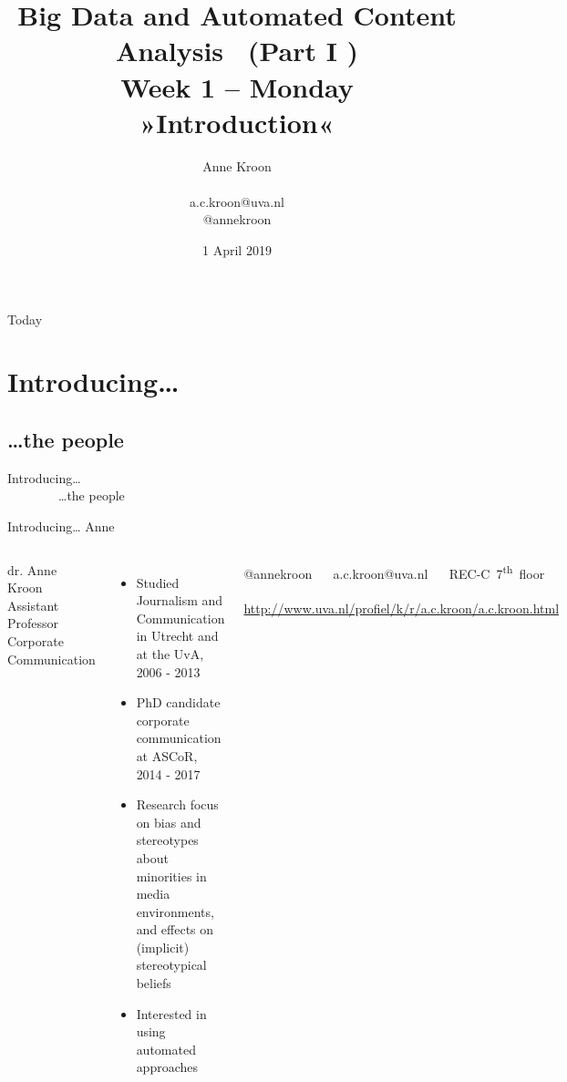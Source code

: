 \documentclass{beamer}
\begin{document}
\title[Big Data and Automated Content Analysis]{\textbf{Big Data and Automated Content Analysis  \ (Part I )} \\ Week 1 -- Monday  \\ »Introduction«}
\author[Anne Kroon]{Anne Kroon \\ ~ \\ \footnotesize{a.c.kroon@uva.nl \\@annekroon} \\}
\date{1 April 2019}


\begin{frame}{}
\titlepage
\end{frame}

\begin{frame}{Today}
\tableofcontents
\end{frame}

\section{Introducing\ldots}
\subsection{\ldots the people}

\begin{frame} 
	Introducing\ldots \\
	~~~~~~~~\ldots the people
\end{frame}


\begin{frame}{Introducing\ldots} {\huge{Anne}} \small{} 
	\begin{columns}[]    dr. Anne Kroon \\ 
Assistant Professor Corporate Communication
 \begin{itemize} 
 	\item Studied Journalism and Communication in Utrecht
 	and at the UvA,  2006 - 2013
 	\item PhD candidate corporate communication at ASCoR, 2014 - 2017
 	\item Research focus on bias and stereotypes about minorities in media environments, and effects on (implicit) stereotypical beliefs
 	\item Interested in using automated approaches
 \end{itemize} @annekroon ~~ a.c.kroon@uva.nl  ~~ REC-C~7\textsuperscript{th}~floor ~~ \url{http://www.uva.nl/profiel/k/r/a.c.kroon/a.c.kroon.html} 
\end{columns} \end{frame}
\end{document}
